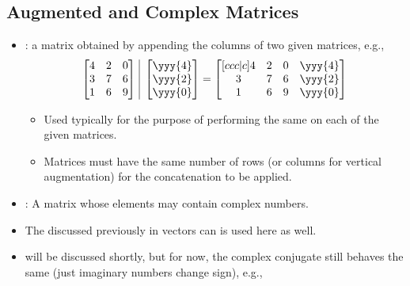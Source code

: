 \begin{itemize}
\begin{itemize}
\begin{itemize}
      \end{itemize}
  \end{itemize}
  
  \subsection{Augmented and Complex Matrices}\label{Augmented and Complex Matrices}
  \begin{itemize}
    \item {}: a matrix obtained by appending the columns of two given matrices, e.g.,
    \[%
    \begin{bmatrix}
    4 & 2 & 0 \\
    3 & 7 & 6 \\
    1 & 6 & 9 
    \end{bmatrix}
    ~\vline~
    \begin{bmatrix} \yyy{4} \\ \yyy{2} \\ \yyy{0} \end{bmatrix}
    =
    \begin{bmatrix}[ccc|c]
      4 & 2 & 0 & \yyy{4} \\
      3 & 7 & 6 & \yyy{2} \\
      1 & 6 & 9 & \yyy{0} 
    \end{bmatrix}
    \]%
    \begin{itemize}
      \item Used typically for the purpose of performing the same \hyperref[Elementary Operations]{} on each of the given matrices. 
      \item Matrices must have the same number of rows (or columns for vertical augmentation) for the concatenation to be applied.
    \end{itemize}
    \item {}: A matrix whose elements may contain complex numbers.
    \item The \hyperref[Conjugate Transpose]{} discussed previously in vectors can is used here as well.
    \item \hyperref[Transposition]{} will be discussed shortly, but for now, the complex conjugate still behaves the same (just imaginary numbers change sign), e.g.,
    \[%
\]
\end{itemize}
\end{itemize}
